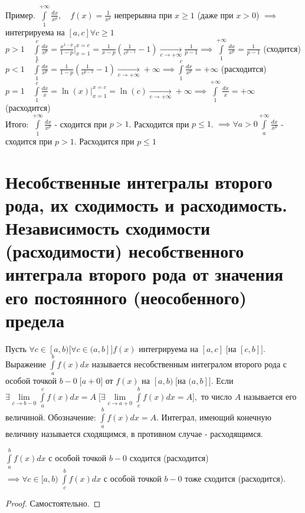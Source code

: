 \documentclass[../main.tex]{subfiles}
\begin{document}
Пример. $\int\limits_{1}^{+\infty} \frac{dx}{x^{p}},\quad f(x)=\frac{1}{x^{p}} $ непрерывна при $x\geqslant 1$ (даже при $x>0$) $\implies $интегрируема на $[a,c] \forall c\geqslant 1$ 
\\ $p>1 \quad \int\limits_{1}^{c} \frac{dx}{x^{p}}= \frac{x^{1-p}}{1-p}\bigg|_{x=1}^{x=c}=\frac{1}{x-p}\left(\frac{1}{c^{p-1}}-1\right)\underset{c\to+\infty}{\to} \frac{1}{p-1}\implies \int\limits_{1}^{+\infty}\frac{dx}{x^{p}}=\frac{1}{p-1}$ (сходится)
\\ $p<1\quad \int\limits_{1}^{c}\frac{dx}{x^{p}}=\frac{1}{1-p}\left(\frac{1}{c^{p-1}}-1\right)\underset{c\to+\infty}{\to} +\infty \implies \int\limits_{1}^{c}\frac{dx}{x^{p}}=+\infty$ (расходится)
\\ $p=1 \quad \int\limits_{1}^{c}\frac{dx}{x}=\ln{(x)}\bigg|_{x=1}^{x=c}=\ln{(c)}\underset{c\to+\infty}{\to}+\infty \implies \int\limits_{1}^{+\infty}\frac{dx}{x} =+\infty$ (расходится)
\\ Итого: $\int\limits_{1}^{+\infty}\frac{dx}{x^{p}} $ - сходится при $p>1$. Расходится при $p\leqslant 1$. $\implies \forall a>0 \int\limits_{a}^{+\infty}\frac{dx}{x^{p}} $ - сходится при $p>1$. Расходится при $p\leqslant 1$


\section{Несобственные интегралы второго рода, их сходимость и расходимость. Независимость сходимости (расходимости) несобственного интеграла второго рода от значения его постоянного (неособенного) предела}
\begin{definition}
    Пусть $\forall c\in[a,b) \bigg[\forall c\in (a,b]\bigg] f(x)$ интегрируема на $[a,c]\; \bigg[\text{на }[c,b]\bigg].$ Выражение $\int\limits_{a  }^{b    } f(x)dx$ называется несобственным интегралом второго рода с особой точкой $b-0 \;\bigg[a+0\bigg]$ от $f(x)$ на $[a,b)\;\bigg[\text{на }(a,b]\bigg]$. 
    Если $\exists \lim\limits_{c    \to b-0} \int\limits_{ a    }^{c    } f(x)dx=A \; \bigg[\exists \lim\limits_{c  \to a+0}\int\limits_{c  }^{b    } f(x)dx=A \bigg], $ то число $A$ называется его величиной. Обозначение: $\int\limits_{a }^{b    } f(x)dx=A.$ Интеграл, имеющий конечную величину называется сходящимся, в противном случае - расходящимся.
\end{definition}

\begin{theorem}
    $\int\limits_{a }^{b    } f(x)dx $ с особой точкой $b-0$ сходится (расходится) $\implies \forall c\in[a,b) \; \int\limits_{c    }^{b    } f(x)dx $ с особой точкой $b-0$ тоже сходится (расходится).  
\end{theorem}
\begin{proof}
    Самостоятельно.
\end{proof}
\end{document}
